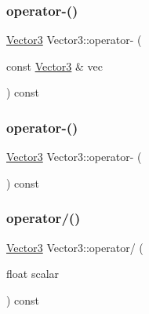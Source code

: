 \mbox{\label{class_vector3_afb3734d29da79f12b1b02e0542433bd3}} 
\subsubsection{\texorpdfstring{operator-\/()}{operator-()}\hspace{0.1cm}{\footnotesize\ttfamily [1/2]}}
{\footnotesize\ttfamily \hyperlink{class_vector3}{Vector3} Vector3\+::operator-\/ (\begin{DoxyParamCaption}\item[{const \hyperlink{class_vector3}{Vector3} \&}]{vec }\end{DoxyParamCaption}) const\hspace{0.3cm}{\ttfamily [inline]}}

\mbox{\label{class_vector3_abf941de6e1724901c46d5e9e1448358f}} 
\subsubsection{\texorpdfstring{operator-\/()}{operator-()}\hspace{0.1cm}{\footnotesize\ttfamily [2/2]}}
{\footnotesize\ttfamily \hyperlink{class_vector3}{Vector3} Vector3\+::operator-\/ (\begin{DoxyParamCaption}{ }\end{DoxyParamCaption}) const\hspace{0.3cm}{\ttfamily [inline]}}

\mbox{\label{class_vector3_ad9ced662f4acf9c06de6655bd33ea683}} 
\subsubsection{\texorpdfstring{operator/()}{operator/()}}
{\footnotesize\ttfamily \hyperlink{class_vector3}{Vector3} Vector3\+::operator/ (\begin{DoxyParamCaption}\item[{float}]{scalar }\end{DoxyParamCaption}) const\hspace{0.3cm}{\ttfamily [inline]}}

